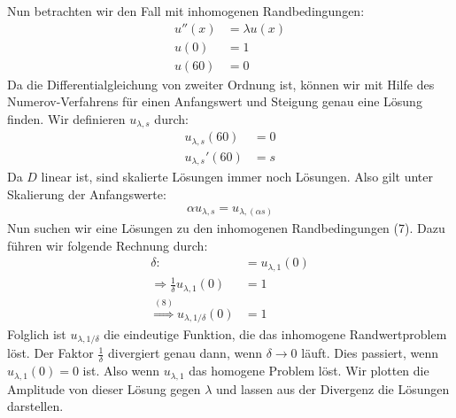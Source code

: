 \documentclass[ngerman]{scrartcl}
\begin{document}
	Nun betrachten wir den Fall mit inhomogenen Randbedingungen:
	\begin{align}
		u''(x) &= \lambda u(x)\\
		u(0) &= 1\nonumber\\
		u(60) &= 0\nonumber
	\end{align}
	Da die Differentialgleichung von zweiter Ordnung ist, können wir mit Hilfe des Numerov-Verfahrens für einen Anfangswert und Steigung genau eine Lösung finden. Wir definieren $u_{\lambda,s}$ durch:
	\begin{align*}
		u_{\lambda,s}(60)&=0\\
		u_{\lambda,s}'(60)&=s
	\end{align*}
	Da $D$ linear ist, sind skalierte Lösungen immer noch Lösungen. Also gilt unter Skalierung der Anfangswerte: 
	\begin{align}
		\alpha u_{\lambda,s}=u_{\lambda,(\alpha s)}
	\end{align}
	Nun suchen wir eine Lösungen zu den inhomogenen Randbedingungen (7). Dazu führen wir folgende Rechnung durch:
	\begin{align*}
		\delta:&=u_{\lambda,1}(0)\\
		\Rightarrow \frac{1}{\delta}u_{\lambda,1}(0)&=1\\
		\overset{(8)}{\Rightarrow}u_{\lambda,1/\delta}(0)&=1
	\end{align*}
	Folglich ist $u_{\lambda,1/\delta}$ die eindeutige Funktion, die das inhomogene Randwertproblem löst.
	Der Faktor $\frac{1}{\delta}$ divergiert genau dann, wenn $\delta \rightarrow 0$ läuft.
	Dies passiert, wenn $u_{\lambda,1}(0)=0$ ist. Also wenn $u_{\lambda,1}$ das homogene Problem löst.
	Wir plotten die Amplitude von dieser Lösung gegen $\lambda$ und lassen aus der Divergenz die Lösungen darstellen.
\end{document}
